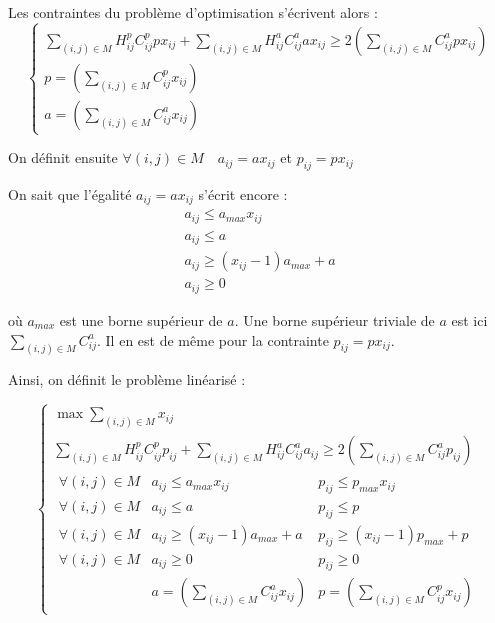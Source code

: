 \documentclass[a4paper,11pt] {article}
\begin{document}
Les contraintes du problème d'optimisation s'écrivent alors : 
\begin{equation}
\left\{
\begin{array}{l}
\sum\limits_{(i,j)\in M} H^p_{ij}C^p_{ij}px_{ij} + \sum\limits_{(i,j)\in M} H^a_{ij}C^a_{ij}ax_{ij} \geq 2(\sum\limits_{(i,j)\in M} C^a_{ij}px_{ij})\\
p = (\sum\limits_{(i,j)\in M} C^p_{ij}x_{ij})\\
a = (\sum\limits_{(i,j)\in M} C^a_{ij}x_{ij})
\end{array}
\right.
\end{equation}

On définit ensuite $\forall (i,j)\in M\quad a_{ij}=ax_{ij}$ et $p_{ij}=px_{ij}$



On sait que l’égalité $a_{ij}=ax_{ij}$ s’écrit encore : 
\begin{equation}
\begin{array}{l}
a_{ij}\leq a_{max}x_{ij}\\
a_{ij}\leq a\\
a_{ij}\geq (x_{ij}-1)a_{max}+a\\
a_{ij} \geq 0
\end{array}
\end{equation}

où $a_{max}$ est une borne supérieur de $a$. Une borne supérieur triviale de $a$ est ici $\sum\limits_{(i,j)\in M} C^a_{ij}$. Il en est de même pour la contrainte $p_{ij}=px_{ij}$.

Ainsi, on définit le problème linéarisé : 

\begin{equation}
\left\{
\begin{array}{l}
\max \sum\limits_{(i,j)\in M} x_{ij}\\
\sum\limits_{(i,j)\in M} H^p_{ij}C^p_{ij}p_{ij} + \sum\limits_{(i,j)\in M} H^a_{ij}C^a_{ij}a_{ij} \geq 2(\sum\limits_{(i,j)\in M} C^a_{ij}p_{ij})\\
	\begin{array}{lll}
		\forall{(i,j)} \in M&a_{ij}\leq a_{max}x_{ij}&p_{ij}\leq p_{max}x_{ij}\\
		\forall{(i,j)} \in M&a_{ij}\leq a&p_{ij}\leq p\\
		\forall{(i,j)} \in M&a_{ij}\geq (x_{ij}-1)a_{max}+a&p_{ij}\geq (x_{ij}-1)p_{max}+p\\
		\forall{(i,j)} \in M&a_{ij} \geq 0&p_{ij} \geq 0\\
		&a = (\sum\limits_{(i,j)\in M} C^a_{ij}x_{ij})&p = (\sum\limits_{(i,j)\in M} C^p_{ij}x_{ij})
	\end{array}
\end{array}
\right.
\end{equation}
\end{document}
